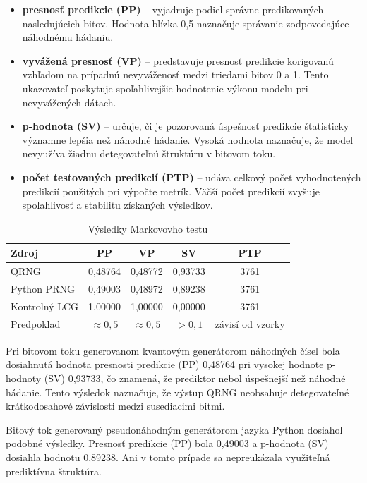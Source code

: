 \begin{itemize}
  \item \textbf{presnosť predikcie (PP)} -- vyjadruje podiel správne predikovaných nasledujúcich bitov. Hodnota blízka 0,5 naznačuje správanie zodpovedajúce náhodnému hádaniu.

  \item \textbf{vyvážená presnosť (VP)} -- predstavuje presnosť predikcie korigovanú vzhľadom na prípadnú nevyváženosť medzi triedami bitov 0 a 1. Tento ukazovateľ poskytuje spoľahlivejšie hodnotenie výkonu modelu pri nevyvážených dátach.

  \item \textbf{p-hodnota (SV)} -- určuje, či je pozorovaná úspešnosť predikcie štatisticky významne lepšia než náhodné hádanie. Vysoká hodnota naznačuje, že model nevyužíva žiadnu detegovateľnú štruktúru v bitovom toku.

  \item \textbf{počet testovaných predikcií (PTP)} -- udáva celkový počet vyhodnotených predikcií použitých pri výpočte metrík. Väčší počet predikcií zvyšuje spoľahlivosť a stabilitu získaných výsledkov.
\end{itemize}


\begin{table}[H]
  \centering
  \caption{Výsledky Markovovho testu}
  \label{tab:markov}
  \begin{tabular}{lcccc}
    \toprule
    \textbf{Zdroj} & \textbf{PP} & \textbf{VP} & \textbf{SV} & \textbf{PTP} \\
    \midrule
    QRNG           & 0,48764 & 0,48772 & 0,93733 & 3761 \\
    Python PRNG    & 0,49003 & 0,48972 & 0,89238 & 3761 \\
    Kontrolný LCG  & 1,00000 & 1,00000 & 0,00000 & 3761 \\
    \midrule
    Predpoklad & $\approx 0,5$ & $\approx 0,5$ & $> 0,1$ & závisí od vzorky \\
    \bottomrule
  \end{tabular}
\end{table}

Pri bitovom toku generovanom kvantovým generátorom náhodných čísel bola dosiahnutá hodnota presnosti predikcie (PP) 0,48764 pri vysokej hodnote p-hodnoty (SV) 0,93733, čo znamená, že prediktor nebol úspešnejší než náhodné hádanie.
Tento výsledok naznačuje, že výstup QRNG neobsahuje detegovateľné krátkodosahové závislosti medzi susediacimi bitmi.

Bitový tok generovaný pseudonáhodným generátorom jazyka Python dosiahol podobné výsledky.
Presnosť predikcie (PP) bola 0,49003 a p-hodnota (SV) dosiahla hodnotu 0,89238.
Ani v tomto prípade sa nepreukázala využiteľná prediktívna štruktúra.

